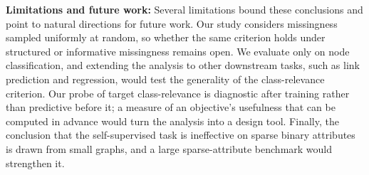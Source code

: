 \textbf{Limitations and future work:} Several limitations bound these conclusions and point to natural directions for future work. Our study considers missingness sampled uniformly at random, so whether the same criterion holds under structured or informative missingness remains open. We evaluate only on node classification, and extending the analysis to other downstream tasks, such as link prediction and regression, would test the generality of the class-relevance criterion. Our probe of target class-relevance is diagnostic after training rather than predictive before it; a measure of an objective's usefulness that can be computed in advance would turn the analysis into a design tool. Finally, the conclusion that the self-supervised task is ineffective on sparse binary attributes is drawn from small graphs, and a large sparse-attribute benchmark would strengthen it.
